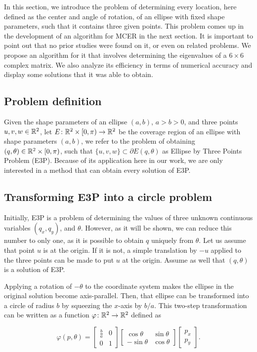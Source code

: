 In this section, we introduce the problem of determining every location, here defined as the center and angle of rotation, of an ellipse with fixed shape parameters, such that it contains three given points.
This problem comes up in the development of an algorithm for MCER in the next section. 
It is important to point out that no prior studies were found on it, or even on related problems.
We propose an algorithm for it that involves determining the eigenvalues of a $6\times6$ complex matrix. We also analyze its efficiency in terms of numerical accuracy and display some solutions that it was able to obtain.

\subsection{Problem definition}

Given the shape parameters of an ellipse $(a, b)$, $a > b >0$, and three points $u, v, w \in \mathbb{R}^2$, let $E\colon \mathbb{R}^2\times [0, \pi)\to\mathbb{R}^2$ be the coverage region of an ellipse with shape parameters $(a, b)$, we refer to the problem of obtaining $(q, \theta) \in \mathbb{R}^2\times [0, \pi)$, such that $\{u, v, w\} \subset \partial E(q, \theta)$ as Ellipse by Three Points Problem (E3P).
Because of its application here in our work, we are only interested in a method that can obtain every solution of E3P.

\subsection{Transforming E3P into a circle problem}

Initially, E3P is a problem of determining the values of three unknown continuous variables $(q_x, q_y)$, and $\theta$. However, as it will be shown, we can reduce this number to only one, as it is possible to obtain $q$ uniquely from $\theta$.
Let us assume that point $u$ is at the origin. If it is not, a simple translation by $-u$ applied to the three points can be made to put $u$ at the origin.
Assume as well that $(q, \theta)$ is a solution of E3P. 

Applying a rotation of $-\theta$ to the coordinate system makes the ellipse in the original solution become axis-parallel.
Then, that ellipse can be transformed into a circle of radius $b$ by squeezing the $x$-axis by $b/a$. This two-step transformation can be written as a function $\varphi\colon \mathbb{R}^2 \to \mathbb{R}^2$ defined as

\begin{equation}\label{eq:trpnts}
\varphi(p, \theta)=\left[\begin{array}{cc}
\frac{b}{a}&0\\
0&1
\end{array}\right]
\left[\begin{array}{cc}
\cos{\theta}&\sin{\theta}\\
-\sin{\theta}&\cos{\theta}
\end{array}\right]\left[\begin{array}{c}
p_x\\
p_y
\end{array}\right].
\end{equation}

